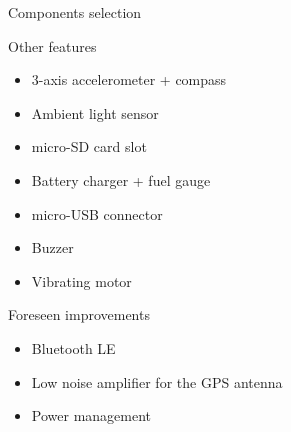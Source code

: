 \documentclass[compress,red]{beamer}
\begin{document}
\begin{frame}{Components selection}

  Other features
  \begin{itemize}
  \item 3-axis accelerometer + compass
  \item Ambient light sensor
  \item micro-SD card slot
  \item Battery charger + fuel gauge
  \item micro-USB connector
  \item Buzzer
  \item Vibrating motor
  \end{itemize}

  \vskip 5mm
  Foreseen improvements
  \begin{itemize}
  \item Bluetooth LE
  \item Low noise amplifier for the GPS antenna
  \item Power management
  \end{itemize}

  \begin{center}
  \end{center}


\end{frame}
\end{document}
